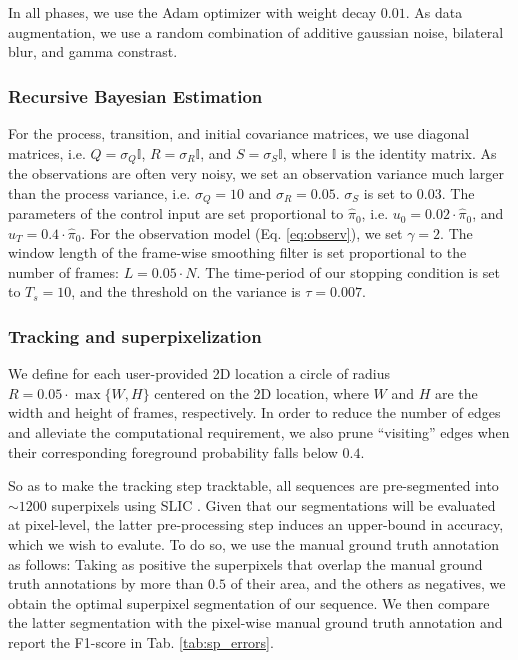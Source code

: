 In all phases, we use the Adam optimizer \cite{kingma14} with weight decay $0.01$.
As data augmentation, we use a random combination of additive gaussian noise, bilateral blur, and gamma constrast.

\subsubsection{Recursive Bayesian Estimation}
For the process, transition, and initial covariance matrices, we use diagonal matrices, i.e.
$Q=\sigma_{Q}\mathbb{I}$, $R=\sigma_{R}\mathbb{I}$, and $S=\sigma_{S}\mathbb{I}$, where $\mathbb{I}$ is the identity matrix.
As the observations are often very noisy, we set an observation variance much larger than the process variance, i.e. $\sigma_{Q}=10$ and $\sigma_{R}=0.05$.
$\sigma_{S}$ is set to $0.03$.
The parameters of the control input are set proportional to $\hat \pi_{0}$, i.e. $u_{0}=0.02 \cdot \hat \pi_{0}$, and $u_{T}=0.4 \cdot \hat \pi_{0}$.
For the observation model (Eq. \ref{eq:observ}), we set $\gamma=2$.
The window length of the frame-wise smoothing filter is set proportional to the number of frames: $L=0.05\cdot N$.
The time-period of our stopping condition is set to $T_{s}=10$, and the threshold on the variance is $\tau=0.007$.

\subsubsection{Tracking and superpixelization}
\label{sec:org4560526}
We define for each user-provided 2D location a circle of radius \(R=0.05 \cdot \max\{W,H\}\) centered on the 2D location, where \(W\) and \(H\) are the width and height of frames, respectively.
In order to reduce the number of edges and alleviate the computational requirement, we also prune ``visiting'' edges when their corresponding foreground probability falls below $0.4$.

So as to make the tracking step tracktable, all sequences are pre-segmented into $\sim 1200$ superpixels using SLIC \cite{achanta12}.
Given that our segmentations will be evaluated at pixel-level, the latter pre-processing step induces an upper-bound in accuracy, which we wish to evalute.
To do so, we use the manual ground truth annotation as follows:
Taking as positive the superpixels that overlap the manual ground truth annotations by more than $0.5$ of their area, and the others as negatives, we obtain the optimal superpixel segmentation of our sequence.
We then compare the latter segmentation with the pixel-wise manual ground truth annotation and report the F1-score in Tab. \ref{tab:sp_errors}.



